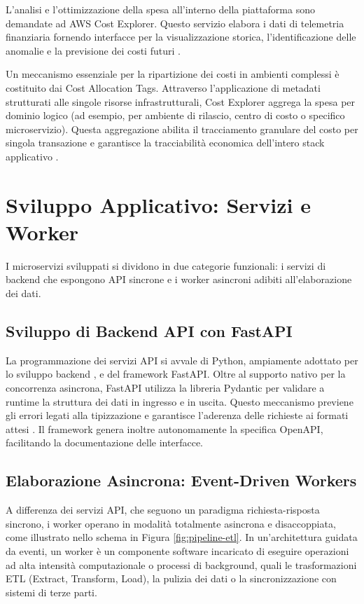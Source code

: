 L'analisi e l'ottimizzazione della spesa all'interno della piattaforma sono demandate ad AWS Cost Explorer. Questo servizio elabora i dati di telemetria finanziaria fornendo interfacce per la visualizzazione storica, l'identificazione delle anomalie e la previsione dei costi futuri \cite{CostExplorer}.

Un meccanismo essenziale per la ripartizione dei costi in ambienti complessi è costituito dai Cost Allocation Tags. Attraverso l'applicazione di metadati strutturati alle singole risorse infrastrutturali, Cost Explorer aggrega la spesa per dominio logico (ad esempio, per ambiente di rilascio, centro di costo o specifico microservizio). Questa aggregazione abilita il tracciamento granulare del costo per singola transazione e garantisce la tracciabilità economica dell'intero stack applicativo \cite{CostAllocationTags}.

\section{Sviluppo Applicativo: Servizi e Worker}
\label{sec:app_frameworks}

I microservizi sviluppati si dividono in due categorie funzionali: i servizi di backend che espongono API sincrone e i worker asincroni adibiti all'elaborazione dei dati.

\subsection{Sviluppo di Backend API con FastAPI}
La programmazione dei servizi API si avvale di Python, ampiamente adottato per lo sviluppo backend \cite{PythonTrends}, e del framework FastAPI. Oltre al supporto nativo per la concorrenza asincrona, FastAPI utilizza la libreria Pydantic per validare a runtime la struttura dei dati in ingresso e in uscita. Questo meccanismo previene gli errori legati alla tipizzazione e garantisce l'aderenza delle richieste ai formati attesi \cite{FastAPIDoc}. Il framework genera inoltre autonomamente la specifica OpenAPI, facilitando la documentazione delle interfacce.

\subsection{Elaborazione Asincrona: Event-Driven Workers}
A differenza dei servizi API, che seguono un paradigma richiesta-risposta sincrono, i worker operano in modalità totalmente asincrona e disaccoppiata, come illustrato nello schema in Figura \ref{fig:pipeline-etl}. In un'architettura guidata da eventi, un worker è un componente software incaricato di eseguire operazioni ad alta intensità computazionale o processi di background, quali le trasformazioni ETL (Extract, Transform, Load), la pulizia dei dati o la sincronizzazione con sistemi di terze parti.

